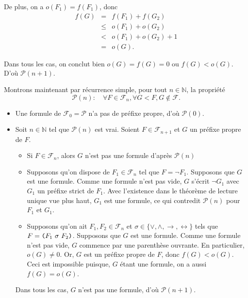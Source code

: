 \documentclass[./main]{subfiles}
\begin{document}
\begin{prv}
\begin{itemize}
\begin{itemize}
\begin{itemize}
                De plus, on a $o(F_1) = f(F_1)$, donc
                \[\begin{array}{rcl}
                  f(G)&=&f(F_1) + f(G_2)\\
                  &\le&o(F_1) + o(G_2)\\
                  &<&o(F_1) + o(G_2) + 1\\
                &=&o(G).\end{array}\]
            \end{itemize}
        \end{itemize}
        Dans tous les cas, on conclut bien $o(G) = f(G) = 0$ ou $f(G) < o(G)$.
        D'où $\mathcal{P}(n+1)$.
    \end{itemize}

    Montrons maintenant par récurrence simple, pour tout $n \in \mathds{N}$, la propriété 
    \[\mathcal{P}(n) : \quad \forall F \in \mathcal{F}_n, \forall G < F, G \notin \mathcal{F}.\]
    \begin{itemize}
      \item Une formule de $\mathcal{F}_0 = \mathcal{P}$ n'a pas de préfixe propre, d'où $\mathcal{P}(0)$.
      \item Soit $n \in \mathds{N}$ tel que $\mathcal{P}(n)$ est vrai.
        Soient $F \in \mathcal{F}_{n+1}$ et $G$ un préfixe propre de $F$.
        \begin{itemize}
          \item Si $F \in \mathcal{F}_n$, alors $G$ n'est pas une formule d'après $\mathcal{P}(n)$
          \item Supposons qu'on dispose de $F_1 \in \mathcal{F}_n$ tel que $F = \lnot F_1$.
            Supposons que $G$ est une formule.
            Comme une formule n'est pas vide, $G$ s'écrit $\lnot G_1$ avec $G_1$ un préfixe strict de $F_1$.
            Avec l'existence dans le théorème de lecture unique vue plus haut, $G_1$ est une formule, ce qui contredit $\mathcal{P}(n)$ pour $F_1$ et $G_1$.
          \item Supposons qu'on ait $F_1, F_2 \in \mathcal{F}_n$ et $\sigma \in \{\lor, \land, \to, \leftrightarrow\}$ tels que $F = \verb|(| F_1\ \sigma\ F_2 \verb|)|$.
            Supposons que $G$ est une formule.
            Comme une formule n'est pas vide, $G$ commence par une parenthèse ouvrante.
            En particulier, $o(G) \ne 0$.
            Or, $G$ est un préfixe propre de $F$, donc $f(G) < o(G)$.
            Ceci est impossible puisque, $G$ étant une formule, on a aussi $f(G) = o(G)$.
        \end{itemize}
        Dans tous les cas, $G$ n'est pas une formule, d'où $\mathcal{P}(n+1)$.
    \end{itemize}


\end{prv}
\end{document}
